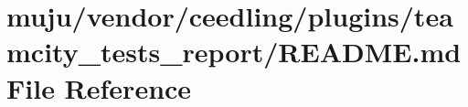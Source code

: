 \hypertarget{vendor_2ceedling_2plugins_2teamcity__tests__report_2_r_e_a_d_m_e_8md}{}\section{muju/vendor/ceedling/plugins/teamcity\+\_\+tests\+\_\+report/\+R\+E\+A\+D\+ME.md File Reference}
\label{vendor_2ceedling_2plugins_2teamcity__tests__report_2_r_e_a_d_m_e_8md}

